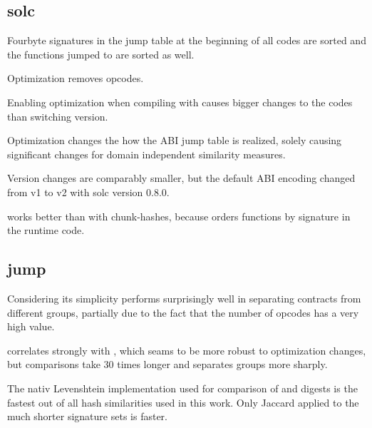 \documentclass[../main.tex]{subfiles}
\begin{document}
\subsection{solc}
\begin{obs}
  Fourbyte signatures in the jump table at the beginning of all codes are sorted and the functions jumped to are sorted as well.
\end{obs}
\begin{obs}
  Optimization removes  opcodes.
\end{obs}
\begin{obs}
  Enabling optimization when compiling with  causes bigger changes to the codes than switching  version.
\end{obs}
\begin{obs}
  Optimization changes the how the ABI jump table is realized, solely causing significant changes for domain independent similarity measures.
\end{obs}
\begin{obs}
  Version changes are comparably smaller, but the default ABI encoding changed from v1 to v2 with solc version 0.8.0.
\end{obs}
\begin{res}
   works better than  with chunk-hashes, because  orders functions by signature in the runtime code.
\end{res}

\subsection{jump}

\begin{hyp}
  Considering its simplicity  performs surprisingly well in separating contracts from different groups, partially due to the fact that the number of  opcodes has a very high  value.
\end{hyp}
\begin{obs}
   correlates strongly with , which seams to be more robust to optimization changes, but comparisons take 30 times longer and  separates groups more sharply.
\end{obs}
\begin{obs}
  The nativ Levenshtein implementation used for comparison of  and  digests is the fastest out of all hash similarities used in this work. Only Jaccard applied to the much shorter  signature sets is faster.
\end{obs}
\end{document}
